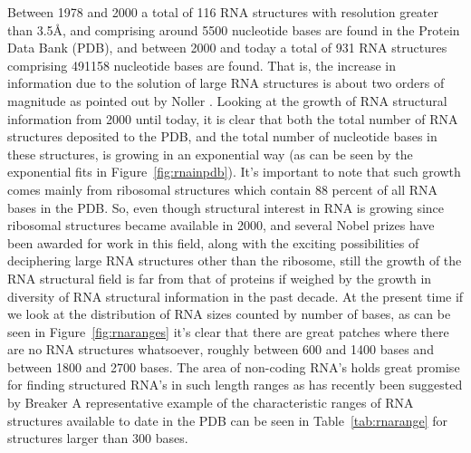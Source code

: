 \noindent Between  1978 and  2000 a total  of 116 RNA  structures with
resolution greater than 3.5\AA,  and comprising around 5500 nucleotide
bases are found  in the Protein Data Bank (PDB),  and between 2000 and
today  a  total of  931  RNA  structures comprising  491158
nucleotide bases are found.  That  is, the increase in information due
to  the  solution of  large  RNA structures  is  about  two orders  of
magnitude as pointed out by Noller \cite{noller2005}.  Looking at the
growth  of RNA  structural information  from 2000  until today,  it is
clear that  both the total number  of RNA structures  deposited to the
PDB, and the total number  of nucleotide bases in these structures, is
growing    in   an   exponential    way   (as    can   be    seen by
the exponential fits  in
Figure~\ref{fig:rnainpdb}).  It's important to  note that  such growth
comes mainly from ribosomal structures which contain 88 percent of all
RNA bases in  the PDB.  So, even though structural  interest in RNA is
growing  since  ribosomal structures  became  available  in 2000,  and
several Nobel prizes  have been awarded for work  in this field, along
with   the   exciting   possibilities   of   deciphering   large   RNA
\cite{weinberg2009}  structures  other than  the  ribosome, still  the
growth of  the RNA structural  field is far  from that of  proteins if
weighed by  the growth in  diversity of RNA structural  information in
the past decade. At the present time if we look at the distribution of
RNA  sizes   counted  by   number  of  bases,   as  can  be   seen  in
Figure~\ref{fig:rnaranges}  it's clear  that there  are  great patches
where there are no RNA  structures whatsoever, roughly between 600 and
1400 bases  and between  1800 and 2700  bases. The area  of non-coding
RNA's holds great promise for  finding structured RNA's in such length
ranges as has recently been suggested by Breaker \cite{weinberg2009}
A representative example of the characteristic ranges of RNA
structures available to date in the PDB can be seen in
Table~\ref{tab:rnarange} for structures larger than 300 bases.

